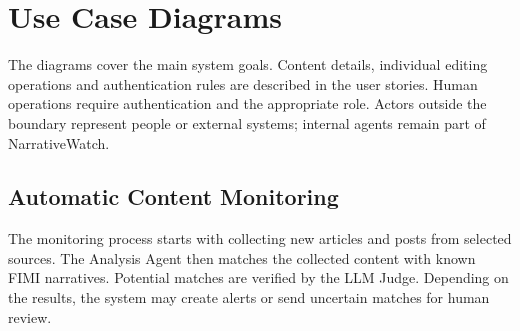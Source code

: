 \documentclass[12pt,a4paper]{article}
\begin{document}
\clearpage




\section{Use Case Diagrams}
\label{sec:use-case-diagrams}

The diagrams cover the main system goals. Content details, individual editing
operations and authentication rules are described in the user stories.
Human operations require authentication and the appropriate role.
Actors outside the boundary represent people or external systems;
internal agents remain part of NarrativeWatch.


\subsection{Automatic Content Monitoring}

The monitoring process starts with collecting new articles
and posts from selected sources. The Analysis Agent then
matches the collected content with known FIMI narratives.
Potential matches are verified by the LLM Judge.
Depending on the results, the system may create alerts
or send uncertain matches for human review.
\end{document}
